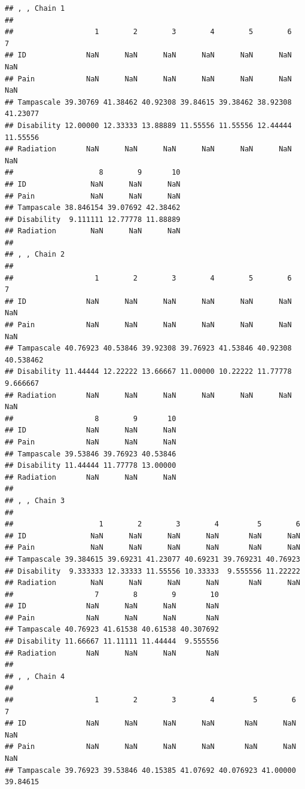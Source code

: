 \documentclass[]{book}
\begin{document}
\begin{verbatim}
## , , Chain 1
## 
##                   1        2        3        4        5        6        7
## ID              NaN      NaN      NaN      NaN      NaN      NaN      NaN
## Pain            NaN      NaN      NaN      NaN      NaN      NaN      NaN
## Tampascale 39.30769 41.38462 40.92308 39.84615 39.38462 38.92308 41.23077
## Disability 12.00000 12.33333 13.88889 11.55556 11.55556 12.44444 11.55556
## Radiation       NaN      NaN      NaN      NaN      NaN      NaN      NaN
##                    8        9       10
## ID               NaN      NaN      NaN
## Pain             NaN      NaN      NaN
## Tampascale 38.846154 39.07692 42.38462
## Disability  9.111111 12.77778 11.88889
## Radiation        NaN      NaN      NaN
## 
## , , Chain 2
## 
##                   1        2        3        4        5        6         7
## ID              NaN      NaN      NaN      NaN      NaN      NaN       NaN
## Pain            NaN      NaN      NaN      NaN      NaN      NaN       NaN
## Tampascale 40.76923 40.53846 39.92308 39.76923 41.53846 40.92308 40.538462
## Disability 11.44444 12.22222 13.66667 11.00000 10.22222 11.77778  9.666667
## Radiation       NaN      NaN      NaN      NaN      NaN      NaN       NaN
##                   8        9       10
## ID              NaN      NaN      NaN
## Pain            NaN      NaN      NaN
## Tampascale 39.53846 39.76923 40.53846
## Disability 11.44444 11.77778 13.00000
## Radiation       NaN      NaN      NaN
## 
## , , Chain 3
## 
##                    1        2        3        4         5        6
## ID               NaN      NaN      NaN      NaN       NaN      NaN
## Pain             NaN      NaN      NaN      NaN       NaN      NaN
## Tampascale 39.384615 39.69231 41.23077 40.69231 39.769231 40.76923
## Disability  9.333333 12.33333 11.55556 10.33333  9.555556 11.22222
## Radiation        NaN      NaN      NaN      NaN       NaN      NaN
##                   7        8        9        10
## ID              NaN      NaN      NaN       NaN
## Pain            NaN      NaN      NaN       NaN
## Tampascale 40.76923 41.61538 40.61538 40.307692
## Disability 11.66667 11.11111 11.44444  9.555556
## Radiation       NaN      NaN      NaN       NaN
## 
## , , Chain 4
## 
##                   1        2        3        4         5        6        7
## ID              NaN      NaN      NaN      NaN       NaN      NaN      NaN
## Pain            NaN      NaN      NaN      NaN       NaN      NaN      NaN
## Tampascale 39.76923 39.53846 40.15385 41.07692 40.076923 41.00000 39.84615

\end{verbatim}
\end{document}
